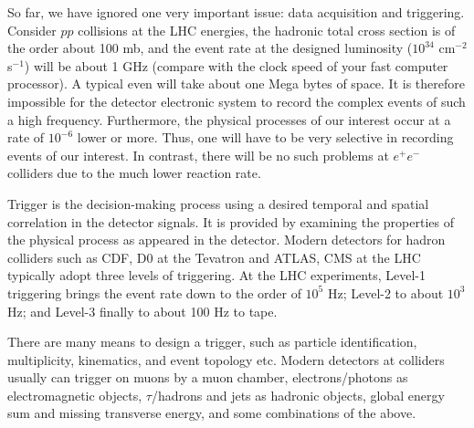 \documentclass[prd,aps,floats,preprintnumbers,preprint,superscriptaddress,floatfix,nofootinbib]{revtex4}
\def\epem{e^+e^-}
\begin{document}
So far, we have ignored one very important issue: data acquisition and 
triggering.
Consider $pp$ collisions at the LHC energies, the hadronic total
cross section is of the order about 100 mb, 
and the event rate at the designed luminosity ($10^{34}$ cm$^{-2}$ s$^{-1}$)
will be about 1 GHz (compare with the clock speed of your fast 
computer processor). A typical even will take about one Mega bytes
of space. 
It is therefore impossible  for the detector electronic system to record
the complex events of such a high frequency. Furthermore,  the 
physical processes of our interest occur at a rate of $10^{-6}$ lower
or more. Thus, one will have to be very selective in recording events 
of our interest. In contrast, there will be no such problems at $\epem$
colliders due to the much lower reaction rate. 

Trigger is the decision-making process using 
a desired temporal and spatial correlation in the detector signals.
It is provided by examining the properties of the physical process
as appeared in the detector. 
Modern detectors for hadron colliders such
as CDF, D0 at the Tevatron and ATLAS, CMS at the LHC
typically adopt three levels of triggering. 
At the LHC experiments, Level-1 triggering brings
the event rate down to the order of $10^{5}$ Hz;  Level-2  to about
$10^{3}$ Hz;  and Level-3  finally to about 100 Hz to tape. 

There are many means to design a 
trigger, such as particle identification, multiplicity, kinematics, 
and event  topology etc. Modern detectors at colliders usually
can trigger on muons by a muon chamber, 
electrons/photons as electromagnetic objects,
$\tau$/hadrons and jets as hadronic objects, global energy sum
and missing transverse energy, and some combinations of the
above.
\end{document}
